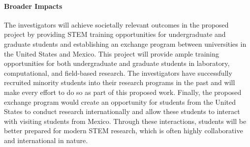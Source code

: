 \paragraph{Broader Impacts}

The investigators will achieve societally relevant outcomes in the proposed project by providing STEM training opportunities for undergraduate and graduate students and establishing an exchange program between universities in the United States and Mexico. This project will provide ample training opportunities for both undergraduate and graduate students in laboratory, computational, and field-based research. The investigators have successfully recruited minority students into their research programs in the past and will make every effort to do so as part of this proposed work. 
Finally, the proposed exchange program would create an opportunity for students from the United States to conduct research internationally and allow these students to interact with visiting students from Mexico. Through these interactions, students will be better prepared for modern STEM research, which is often highly collaborative and international in nature.

